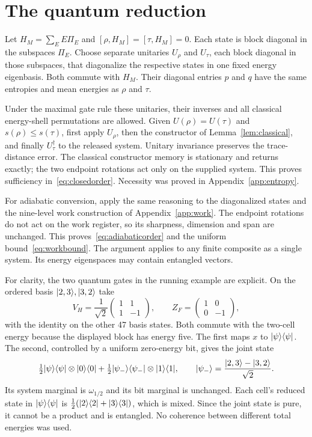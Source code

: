 \section{The quantum reduction}\label{app:quantum}
Let $H_M=\sum_E E\Pi_E$ and $[\rho,H_M]=[\tau,H_M]=0$. Each state is block diagonal in the subspaces $\Pi_E$. Choose separate unitaries $U_\rho$ and $U_\tau$, each block diagonal in those subspaces, that diagonalize the respective states in one fixed energy eigenbasis. Both commute with $H_M$. Their diagonal entries $p$ and $q$ have the same entropies and mean energies as $\rho$ and $\tau$.

Under the maximal gate rule these unitaries, their inverses and all classical energy-shell permutations are allowed. Given $U(\rho)=U(\tau)$ and $s(\rho)\le s(\tau)$, first apply $U_\rho$, then the constructor of Lemma~\ref{lem:classical}, and finally $U_\tau^\dagger$ to the released system. Unitary invariance preserves the trace-distance error. The classical constructor memory is stationary and returns exactly; the two endpoint rotations act only on the supplied system. This proves sufficiency in~\eqref{eq:closedorder}. Necessity was proved in Appendix~\ref{app:entropy}.

For adiabatic conversion, apply the same reasoning to the diagonalized states and the nine-level work construction of Appendix~\ref{app:work}. The endpoint rotations do not act on the work register, so its sharpness, dimension and span are unchanged. This proves~\eqref{eq:adiabaticorder} and the uniform bound~\eqref{eq:workbound}. The argument applies to any finite composite as a single system. Its energy eigenspaces may contain entangled vectors.

For clarity, the two quantum gates in the running example are explicit. On the ordered basis $\lvert 2,3\rangle,\lvert 3,2\rangle$ take
\[
 V_H=\frac1{\sqrt2}\begin{pmatrix}1&1\\1&-1\end{pmatrix},\qquad
 Z_F=\begin{pmatrix}1&0\\0&-1\end{pmatrix},
\]
with the identity on the other 47 basis states. Both commute with the two-cell energy because the displayed block has energy five. The first maps $x$ to $\lvert \psi\rangle\langle \psi\rvert$. The second, controlled by a uniform zero-energy bit, gives the joint state
\[
 \tfrac12\lvert \psi\rangle\langle \psi\rvert\otimes\lvert 0\rangle\langle 0\rvert+\tfrac12\lvert \psi_-\rangle\langle \psi_-\rvert\otimes\lvert 1\rangle\langle 1\rvert,\qquad
 \lvert \psi_-\rangle=\frac{\lvert 2,3\rangle-\lvert 3,2\rangle}{\sqrt2}.
\]
Its system marginal is $\omega_{1/2}$ and its bit marginal is unchanged. Each cell's reduced state in $\lvert \psi\rangle\langle \psi\rvert$ is $\tfrac12(\lvert 2\rangle\langle 2\rvert+\lvert 3\rangle\langle 3\rvert)$, which is mixed. Since the joint state is pure, it cannot be a product and is entangled. No coherence between different total energies was used.

